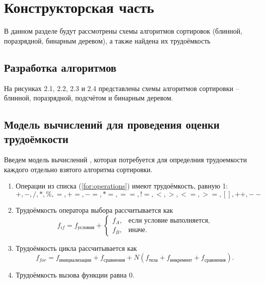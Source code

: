 \chapter{Конструкторская часть}
В данном разделе будут рассмотрены схемы алгоритмов сортировок (блинной, поразрядной, бинарным деревом), а также найдена их трудоёмкость


\section{Разработка алгоритмов}
На рисунках 2.1, 2.2, 2.3 и 2.4 представлены схемы алгоритмов сортировки -- блинной, поразрядной, подсчётом и бинарным деревом.

\clearpage

\section{Модель вычислений для проведения оценки трудоёмкости}
Введем модель вычислений \cite{model}, которая потребуется для определния трудоемкости каждого отдельно взятого алгоритма сортировки.

\begin{enumerate}[label=\arabic*)]
	\item Операции из списка (\ref{for:operations}) имеют трудоёмкость, равную 1:
	\begin{equation}
		\label{for:operations}
		+, -, /, *, \%, =, +=, -=, *=, ==, !=, <, >, <=, >=, [], ++, {-}-
	\end{equation}
	\item Трудоёмкость оператора выбора  рассчитывается как
	\begin{equation}
		\label{for:if}
		f_{if} = f_{\text{условия}} +
		\begin{cases}
			f_A, & \text{если условие выполняется,}\\
			f_B, & \text{иначе.}
		\end{cases}
	\end{equation}
	\item Трудоёмкость цикла рассчитывается как
	\begin{equation}
		\label{for:cycle}
		f_{for} = f_{\text{инициализации}} + f_{\text{сравнения}} + N(f_{\text{тела}} + f_{\text{инкремент}} + f_{\text{сравнения}}).
	\end{equation}
	\item Трудоёмкость вызова функции равна 0.
\end{enumerate}


